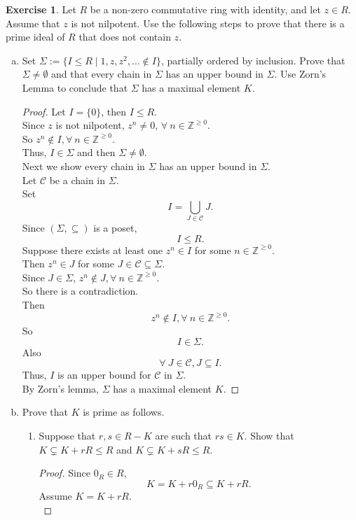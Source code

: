 \documentclass{article}
\newcommand{\bbz}{\mathbb{Z}}
\theoremstyle{plain}
\theoremstyle{definition}
\newtheorem{exer}[lem]{Exercise}
\begin{document}
\begin{exer}
Let $R$ be a non-zero commutative ring with identity, and let $z\in R$.
Assume that $z$ is not nilpotent.
Use the following steps to prove that there is a prime ideal of $R$ that does not contain $z$.
\begin{enumerate}[(a)]
\item Set $\Sigma:=\{I\leq R\mid 1,z,z^2,\ldots\notin I\}$, partially ordered by inclusion. Prove that $\Sigma\neq\emptyset$ and that every chain in $\Sigma$ has an upper bound in $\Sigma$.
Use Zorn's Lemma to conclude that $\Sigma$ has a maximal element $K$.
\begin{proof}
    Let $I = \{0\}$, then $I \leq R$.\\
    Since $z$ is not nilpotent, $z^n \neq 0$, $\forall \ n \in \bbz^{\geq 0}$.\\
    So $z^n \not\in I, \forall \ n \in \bbz^{\geq 0}$.\\
    Thus, $I \in \Sigma$ and then $\Sigma \neq \emptyset$.\\
    Next we show every chain in $\Sigma$ has an upper bound in $\Sigma$.\\
    Let $\mathcal{C}$ be a chain in $\Sigma$.\\
    Set \[I= \bigcup_{J \in \mathcal{C}}J.\]
    Since $(\Sigma, \subseteq)$ is a poset,
    \[I \leq R.\]
    Suppose there exists at least one $z^n \in I$ for some $n \in \bbz^{\geq 0}$.\\
    Then $z^n \in J$ for some $J \in \mathcal{C}\subseteq \Sigma$.\\
    Since $J \in \Sigma$, $z^n \not\in J, \forall \ n \in \bbz^{\geq 0}$.\\
    So there is a contradiction.\\
    Then
    \[z^n \not\in I, \forall \ n \in \bbz^{\geq 0}.\]
    So 
    \[I  \in \Sigma.\]
    Also 
    \[\forall \ J \in \mathcal{C}, J \subseteq I.\]
    Thus, $I$ is an upper bound for $\mathcal{C}$ in $\Sigma$.\\
    By Zorn's lemma, $\Sigma$ has a maximal element $K$.
\end{proof}
\item Prove that $K$ is prime as follows.
\begin{enumerate}[(1)]
\item 
Suppose that $r,s\in R-K$ are such that $rs\in K$. Show that $K\subsetneq K+rR\leq R$
and $K\subsetneq K+sR\leq R$.
\begin{proof}
    Since $0_R \in R$, 
    \[K = K+r0_R \subseteq K+rR.\]
    Assume $K = K + rR$.\\

\end{proof}
\end{enumerate}
\end{enumerate}
\end{exer}
\end{document}

